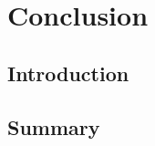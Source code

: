 \chapter{Conclusion}
\cleardoublepage

\minitoc

\section{Introduction}
\begin{refsection}
	\label{chX:Introduction}

	\section{Summary}
	\label{chX:Summary}

\end{refsection}